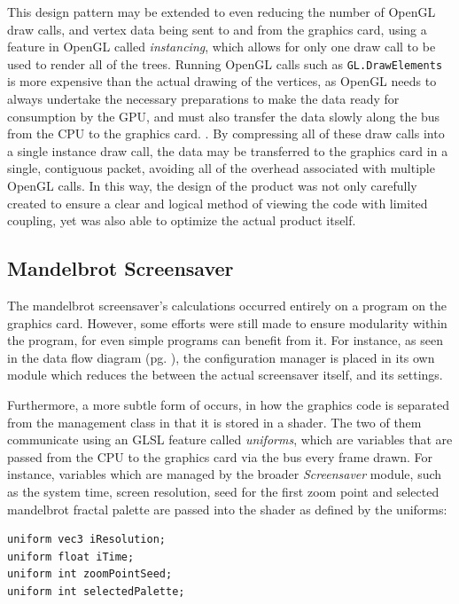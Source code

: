 \documentclass[10pt, openany]{book}
\begin{document}
This design pattern may be extended to even reducing the number of \Gls{OpenGL} draw calls, and vertex data being sent to and from the graphics card, using a feature in \Gls{OpenGL} called \textit{instancing}, which allows for only one draw call to be used to render all of the trees. Running \Gls{OpenGL} calls such as \texttt{GL.DrawElements} is more expensive than the actual drawing of the vertices, as \Gls{OpenGL} needs to always undertake the necessary preparations to make the data ready for consumption by the GPU, and must also transfer the data slowly along the bus from the CPU to the graphics card. \citep{learnOpenGLInstancing}. By compressing all of these draw calls into a single instance draw call, the data may be transferred to the graphics card in a single, contiguous packet, avoiding all of the overhead associated with multiple \Gls{OpenGL} calls. In this way, the design of the product was not only carefully created to ensure a clear and logical method of viewing the code with limited coupling, yet was also able to optimize the actual product itself.

\subsection{Mandelbrot Screensaver}
The mandelbrot screensaver's calculations occurred entirely on a  program on the graphics card. However, some efforts were still made to ensure modularity within the program, for even simple programs can benefit from it. For instance, as seen in the data flow diagram (pg. \pageref{app:mandelbrot-dfd}), the configuration manager is placed in its own module which reduces the  between the actual screensaver itself, and its settings.

Furthermore, a more subtle form of  occurs, in how the graphics code is separated from the management class in that it is stored in a shader. The two of them communicate using an \Gls{GLSL} feature called \textit{uniforms}, which are variables that are passed from the CPU to the graphics card via the bus every frame drawn. For instance, variables which are managed by the broader \textit{Screensaver} module, such as the system time, screen resolution, seed for the first zoom point and selected mandelbrot fractal palette are passed into the shader as defined by the uniforms:

\begin{verbatim}
uniform vec3 iResolution;
uniform float iTime;
uniform int zoomPointSeed;
uniform int selectedPalette;
\end{verbatim}
\end{document}
